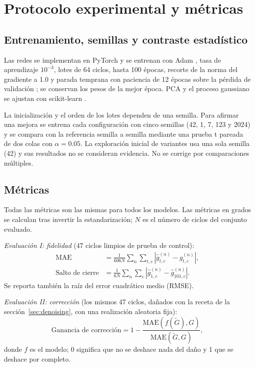 \documentclass[11pt,a4paper]{amsart}
\newcommand{\Mae}{\mathrm{MAE}}
\begin{document}
\section{Protocolo experimental y métricas}
\label{sec:protocolo}

\subsection{Entrenamiento, semillas y contraste estadístico}

Las redes se implementan en PyTorch \cite{paszke2019} y se entrenan con Adam \cite{kingma2015}, tasa de aprendizaje $10^{-3}$, lotes de 64 ciclos, hasta 100 épocas, recorte de la norma del gradiente a 1.0 \cite{pascanu2013} y parada temprana con paciencia de 12 épocas sobre la pérdida de validación \cite{prechelt1998}; se conservan los pesos de la mejor época. PCA y el proceso gaussiano se ajustan con scikit-learn \cite{pedregosa2011}.

La inicialización y el orden de los lotes dependen de una semilla. Para afirmar una mejora se entrena cada configuración con cinco semillas (42, 1, 7, 123 y 2024) y se compara con la referencia semilla a semilla mediante una prueba t pareada de dos colas \cite{student1908} con $\alpha=0.05$. La exploración inicial de variantes usa una sola semilla (42) y sus resultados no se consideran evidencia. No se corrige por comparaciones múltiples.

\subsection{Métricas}

Todas las métricas son las mismas para todos los modelos. Las métricas en grados se calculan tras invertir la estandarización; $N$ es el número de ciclos del conjunto evaluado.

\textit{Evaluación I: fidelidad} (47 ciclos limpios de prueba de control):
\begin{align}
\Mae&=\frac{1}{606N}\sum_{n}\sum_{t,c}\left|\hat g^{(n)}_{t,c}-g^{(n)}_{t,c}\right|,\\
\text{Salto de cierre}&=\frac{1}{6N}\sum_{n}\sum_{c}\left|\hat g^{(n)}_{1,c}-\hat g^{(n)}_{101,c}\right|.
\end{align}
Se reporta también la raíz del error cuadrático medio (RMSE).

\textit{Evaluación II: corrección} (los mismos 47 ciclos, dañados con la receta de la sección~\ref{sec:denoising}, con una realización aleatoria fija):
\begin{equation}
\text{Ganancia de corrección}=1-\frac{\Mae(f(\tilde G),G)}{\Mae(\tilde G,G)} ,
\end{equation}
donde $f$ es el modelo; 0 significa que no se deshace nada del daño y 1 que se deshace por completo.
\end{document}
